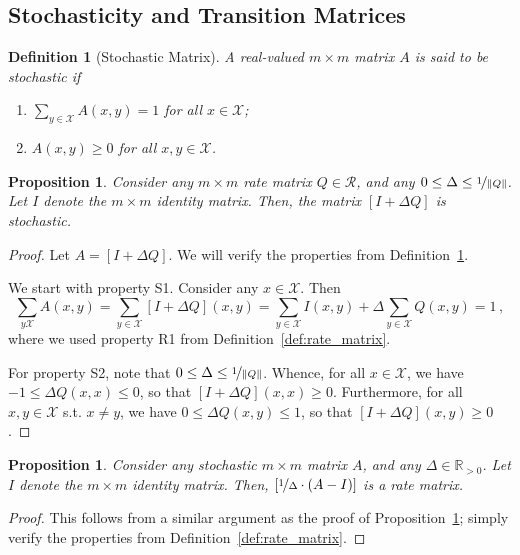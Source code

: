 \documentclass[10pt]{paper}
\newtheorem{proposition}[theorem]{Proposition}
\newtheorem{definition}{Definition}
\newcommand{\reals}{\mathbb{R}}
\newcommand{\realspos}{\reals_{>0}}
\newcommand{\states}{\mathcal{X}}
\newcommand{\norm}[1]{\left\lVert #1 \right\rVert}
\begin{document}
\subsection{Stochasticity and Transition Matrices}

\begin{definition}[Stochastic Matrix]\label{def:stoch_matrix}
A real-valued $m\times m$ matrix $A$ is said to be \emph{stochastic} if
\vspace{5pt}
\begin{enumerate}[label=S\arabic*:]
\item
$\sum_{y\in\states}A(x,y)=1$ for all $x\in\states$;
\item
$A(x,y)\geq0$ for all $x,y\in\states$.
\end{enumerate}
\vspace{5pt}
\noindent
\end{definition}

\begin{proposition}\label{prop:stochastic_from_rate_matrix}
Consider any $m\times m$ rate matrix $Q\in\mathcal{R}$, and any $0\leq \Delta \leq \nicefrac{1}{\norm{Q}}$. Let $I$ denote the $m\times m$ identity matrix. Then, the matrix $[I+\Delta Q]$ is stochastic.
\end{proposition}
\begin{proof}
Let $A=[I+\Delta Q]$. We will verify the properties from Definition~\ref{def:stoch_matrix}.

We start with property S1. Consider any $x\in\states$. Then
\begin{equation*}
\sum_{y\states} A(x,y) = \sum_{y\in\states} [I + \Delta Q](x,y) = \sum_{y\in\states}I(x,y) + \Delta \sum_{y\in\states}Q(x,y) = 1\,,
\end{equation*}
where we used property R1 from Definition~\ref{def:rate_matrix}.

For property S2, note that $0\leq \Delta \leq \nicefrac{1}{\norm{Q}}$. Whence, for all $x\in\states$, we have $-1\leq \Delta Q(x,x) \leq 0$, so that $[I+\Delta Q](x,x) \geq 0$. Furthermore, for all $x,y\in\states$ s.t. $x\neq y$, we have $0\leq \Delta Q(x,y) \leq 1$, so that $[I+\Delta Q](x,y)\geq 0$.
\end{proof}

\begin{proposition}\label{prop:rate_from_stochastic_matrix}
Consider any stochastic $m\times m$ matrix $A$, and any $\Delta\in\realspos$. Let $I$ denote the $m\times m$ identity matrix. Then, $[\nicefrac{1}{\Delta}\cdot(A-I)]$ is a rate matrix.
\end{proposition}
\begin{proof}
This follows from a similar argument as the proof of Proposition~\ref{prop:stochastic_from_rate_matrix}; simply verify the properties from Definition~\ref{def:rate_matrix}.
\end{proof}
\end{document}
